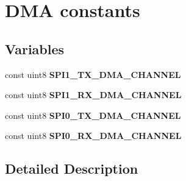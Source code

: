 \hypertarget{group___d_m_a_const}{\section{D\-M\-A constants}
\label{group___d_m_a_const}
}
\subsection*{Variables}
\begin{DoxyCompactItemize}
\item 
\hypertarget{group___d_m_a_const_ga08975e4b544b8869351ad173db595dbe}{const uint8 {\bfseries S\-P\-I1\-\_\-\-T\-X\-\_\-\-D\-M\-A\-\_\-\-C\-H\-A\-N\-N\-E\-L}}\label{group___d_m_a_const_ga08975e4b544b8869351ad173db595dbe}

\item 
\hypertarget{group___d_m_a_const_gafd039076761f5cee62ba9b0d74d9b011}{const uint8 {\bfseries S\-P\-I1\-\_\-\-R\-X\-\_\-\-D\-M\-A\-\_\-\-C\-H\-A\-N\-N\-E\-L}}\label{group___d_m_a_const_gafd039076761f5cee62ba9b0d74d9b011}

\item 
\hypertarget{group___d_m_a_const_ga7e235c7624f1c434f8fa5b318ce10d10}{const uint8 {\bfseries S\-P\-I0\-\_\-\-T\-X\-\_\-\-D\-M\-A\-\_\-\-C\-H\-A\-N\-N\-E\-L}}\label{group___d_m_a_const_ga7e235c7624f1c434f8fa5b318ce10d10}

\item 
\hypertarget{group___d_m_a_const_ga4aefab125000d120c5b6b99a9fdfb068}{const uint8 {\bfseries S\-P\-I0\-\_\-\-R\-X\-\_\-\-D\-M\-A\-\_\-\-C\-H\-A\-N\-N\-E\-L}}\label{group___d_m_a_const_ga4aefab125000d120c5b6b99a9fdfb068}

\end{DoxyCompactItemize}


\subsection{Detailed Description}
